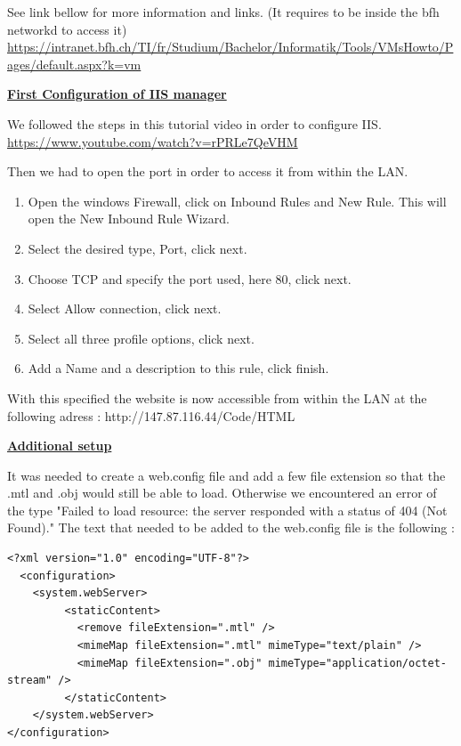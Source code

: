 \documentclass{scrartcl}
\begin{document}
See link bellow for more information and links. (It requires to be inside the bfh networkd to access it)
\url{https://intranet.bfh.ch/TI/fr/Studium/Bachelor/Informatik/Tools/VMsHowto/Pages/default.aspx?k=vm}

\textbf{\underline{First Configuration of IIS manager}}

We followed the steps in this tutorial video in order to configure IIS. \url{https://www.youtube.com/watch?v=rPRLe7QeVHM}

Then we had to open the port in order to access it from within the LAN.
\begin{enumerate}
  \item Open the windows Firewall, click on Inbound Rules and New Rule. This will open the New Inbound Rule Wizard.
  \item Select the desired type, Port, click next.
  \item Choose TCP and specify the port used, here 80, click next.
  \item Select Allow connection, click next.
  \item Select all three profile options, click next.
  \item Add a Name and a description to this rule, click finish.
\end{enumerate}

With this specified the website is now accessible from within the LAN at the following adress : http://147.87.116.44/Code/HTML

\textbf{\underline{Additional setup}}

It was needed to create a web.config file and add a few file extension so that the .mtl and .obj would still be able to load. 
Otherwise we encountered an error of the type "Failed to load resource: the server responded with a status of 404 (Not Found)." 
The text that needed to be added to the web.config file is the following : \\
\lstset{language=XML}
\begin{lstlisting}
<?xml version="1.0" encoding="UTF-8"?>
  <configuration>
    <system.webServer>
         <staticContent>
           <remove fileExtension=".mtl" />
           <mimeMap fileExtension=".mtl" mimeType="text/plain" />
           <mimeMap fileExtension=".obj" mimeType="application/octet-stream" />
         </staticContent>
    </system.webServer>
</configuration>
\end{lstlisting}
\end{document}
